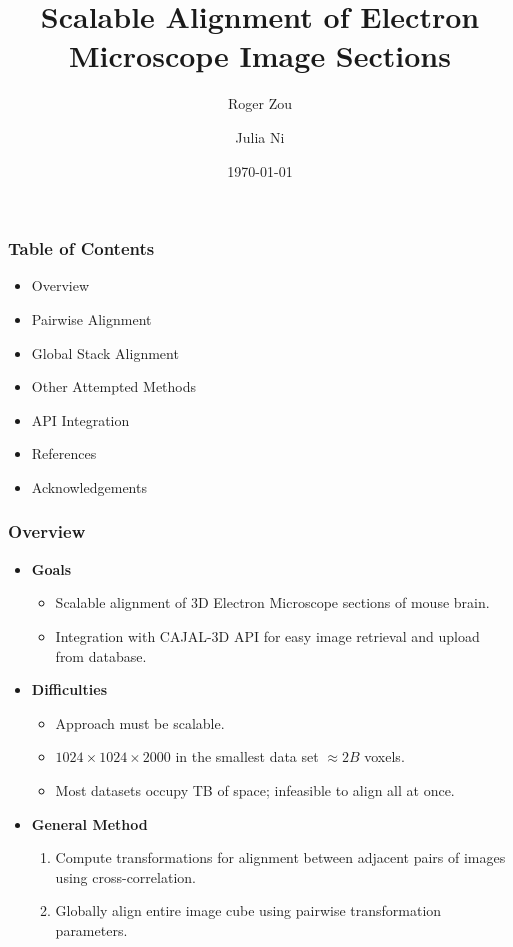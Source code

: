\documentclass{beamer}
\begin{document}
\title[Scalable EM Alignment]
{Scalable Alignment of Electron Microscope Image Sections}
\author[Zou, Ni] {Roger Zou \and Julia Ni}
\date{\today}

\frame{\titlepage}

\begin{frame}
\frametitle{Table of Contents}
\begin{itemize}
\item Overview
\item Pairwise Alignment
\item Global Stack Alignment
\item Other Attempted Methods
\item API Integration 
\item References
\item Acknowledgements 
\end{itemize}
\end{frame}

\begin{frame}
\frametitle{Overview}
\begin{itemize}
\item \textbf{Goals}
\begin{itemize}
\item Scalable alignment of 3D Electron Microscope sections of mouse brain.
\item Integration with CAJAL-3D API for easy image retrieval and upload from database.
\end{itemize}
\item \textbf{Difficulties} 
\begin{itemize}
\item Approach must be scalable.
\item $1024 \times 1024 \times 2000$ in the smallest data set $\approx 2B$ voxels.
\item Most datasets occupy TB of space; infeasible to align all at once.
\end{itemize}
\item \textbf{General Method}
\begin{enumerate}
\item Compute transformations for alignment between adjacent pairs of images using cross-correlation.
\item Globally align entire image cube using pairwise transformation parameters.
\end{enumerate}
\end{itemize}
\end{frame}
\end{document}
